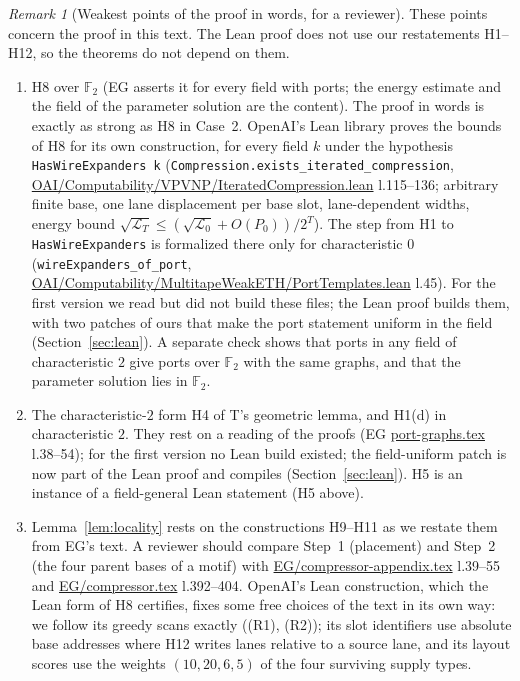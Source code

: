 \documentclass[11pt]{article}
\theoremstyle{definition}
\theoremstyle{remark}
\newtheorem{remark}[theorem]{Remark}
\newcommand{\F}{\mathbb F}
\newcommand{\src}[1]{\url{#1}}
\begin{document}
\begin{remark}[Weakest points of the proof in words, for a reviewer]\label{rem:weak}
These points concern the proof in this text. The Lean proof does not use our restatements H1--H12, so the theorems do not depend
on them.
\begin{enumerate}
\item H8 over $\F_2$ (EG asserts it for every field with ports; the energy estimate and the field of the parameter solution are
  the content). The proof in words is exactly as strong as H8 in Case~2. OpenAI's Lean library proves the bounds of H8 for its
  own construction, for every field $k$ under the hypothesis \texttt{HasWireExpanders k} (\texttt{Compression.exists\_iterated\_compression},
  \src{OAI/Computability/VPVNP/IteratedCompression.lean} l.115--136; arbitrary finite base, one lane displacement per base slot,
  lane-dependent widths, energy bound $\sqrt{\mathcal L_T}\le(\sqrt{\mathcal L_0}+O(P_0))/2^T$). The step from H1 to
  \texttt{HasWireExpanders} is formalized there only for characteristic $0$ (\texttt{wireExpanders\_of\_port},
  \src{OAI/Computability/MultitapeWeakETH/PortTemplates.lean} l.45). For the first version we read but did not build these files; the Lean proof builds them, with two patches of ours that make
  the port statement uniform in the field (Section~\ref{sec:lean}).
  A separate check shows that ports in any field of characteristic $2$ give ports over $\F_2$ with the
  same graphs, and that the parameter solution lies in $\F_2$.
\item The characteristic-$2$ form H4 of T's geometric lemma, and H1(d) in characteristic $2$. They rest on a reading of the proofs
  (EG \src{port-graphs.tex} l.38--54); for the first version no Lean build existed; the field-uniform patch is now part of the Lean proof and compiles
  (Section~\ref{sec:lean}). H5 is an instance of a field-general Lean statement (H5 above).
\item Lemma~\ref{lem:locality} rests on the constructions H9--H11 as we restate them from EG's text. A reviewer should compare
  Step~1 (placement) and Step~2 (the four parent bases of a motif) with \src{EG/compressor-appendix.tex} l.39--55 and
  \src{EG/compressor.tex} l.392--404. OpenAI's Lean construction, which the Lean form of H8 certifies, fixes some free choices of
  the text in its own way: we follow its greedy scans exactly ((R1), (R2)); its slot identifiers use absolute base addresses where
  H12 writes lanes relative to a source lane, and its layout scores use the weights $(10,20,6,5)$ of the four surviving supply types.

\end{enumerate}
\end{remark}
\end{document}
